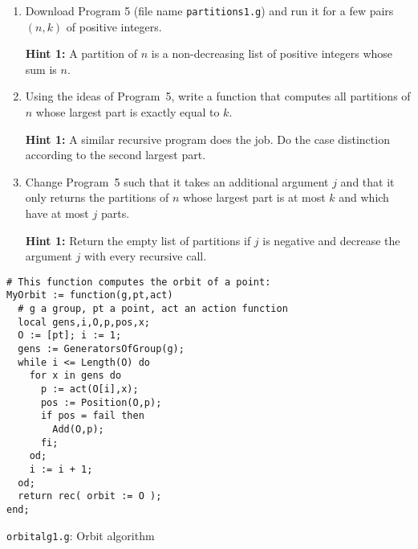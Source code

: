 \documentclass[12pt]{article}
\newcommand{\hint}[1]{\par\textbf{Hint #1:}}
\newcommand{\see}[1]{$\to$ \texttt{?#1}}
\begin{document}
\begin{enumerate}
The first idea to speed things up is to store the points found additionally
in a sorted list. Then a binary search, which is much faster, can provide
the lookup.

Implement this idea to get a faster version of Program~3 from the previous
exercise.
\hint{1} Maintain two additional lists, one which holds the points found so
far but sorted, and another which stores for each of the points in the sorted
list, at which position in the original orbit list \texttt{O} it is kept.
(The latter is needed to get the transversal right.)
\hint{2} Use \see{PositionSorted} for the faster lookup in a sorted list.
Note that if a point is not in the sorted list, then
\texttt{PositionSorted} does not return \texttt{fail} but rather the 
position where the new point would have to be inserted. Do not forget that
this position might be one behind the end of the list!
\item Download Program 5 (file name \texttt{partitions1.g}) and run it
for a few pairs $(n,k)$ of positive integers.
\hint{1} A partition of $n$ is a non-decreasing list of positive integers
whose sum is $n$.
\item Using the ideas of Program~5, write a function that computes
all partitions of $n$ whose largest part is exactly equal to $k$.
\hint{1} A similar recursive program does the job. Do the case distinction
according to the second largest part.
\item Change Program~5 such that it takes an additional argument $j$ and
that it only returns the partitions of $n$ whose largest part is at most
$k$ and which have at most $j$ parts.
\hint{1} Return the empty list of partitions if $j$ is negative and
decrease the argument $j$ with every recursive call.
\end{enumerate}

\newpage
\begin{center}
\begin{minipage}{5in}
\begin{verbatim}
# This function computes the orbit of a point:
MyOrbit := function(g,pt,act)
  # g a group, pt a point, act an action function
  local gens,i,O,p,pos,x;
  O := [pt]; i := 1;
  gens := GeneratorsOfGroup(g);
  while i <= Length(O) do
    for x in gens do
      p := act(O[i],x);
      pos := Position(O,p);
      if pos = fail then
        Add(O,p);
      fi;
    od;
    i := i + 1;
  od;
  return rec( orbit := O );
end;
\end{verbatim}
\begin{center}\texttt{orbitalg1.g}: Orbit algorithm\end{center}
\end{minipage}
\end{center}
\end{document}
